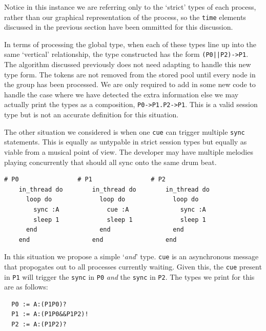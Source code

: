 \documentclass[11pt, abstracton, twoside, titlepage=true]{scrartcl}
\begin{document}
Notice in this instance we are referring only to the `strict' types of each 
process, rather than our graphical representation of the process, so the
\texttt{time} elements discussed in the previous section have been ommitted 
for this discussion.



In terms of processing the global type, when each of these types line up
into the same `vertical' relationship, the type constructed has the form 
\texttt{(P0||P2)->P1}. The algorithm discussed previously does not need
adapting to handle this new type form. The tokens are not removed from the
stored pool until every node in the group has been processed. We are only
required to add in some new code to handle the case where we have detected
the extra information else we may actually print the types as a composition,
\texttt{P0->P1.P2->P1}. This is a valid session type but is not an accurate
definition for this situation.

The other situation we considered is when one \texttt{cue} can trigger
multiple \texttt{sync} statements. This is equally as untypable in strict
session types but equally as viable from a musical point of view. The developer
may have multiple melodies playing concurrently that should all sync onto the
same drum beat.

\begin{minipage}{\textwidth}
	\begin{lstlisting}[style = sonicpi]
    # P0                # P1                # P2
    in_thread do        in_thread do        in_thread do
      loop do             loop do             loop do
        sync :A             cue :A              sync :A
        sleep 1             sleep 1             sleep 1
      end                 end                 end
    end                 end                 end
	\end{lstlisting}
\end{minipage}

In this situation we propose a simple `\emph{and}' type. \texttt{cue} is an
asynchronous message that propogates out to all processes currently waiting.
Given this, the \texttt{cue} present in \texttt{P1} will trigger the \texttt{sync}
in \texttt{P0} \emph{and} the \texttt{sync} in \texttt{P2}. The types we 
print for this are as follows:
\\
\begin{lstlisting}
  P0 := A:(P1P0)?
  P1 := A:(P1P0&&P1P2)!
  P2 := A:(P1P2)?
\end{lstlisting}
\end{document}
